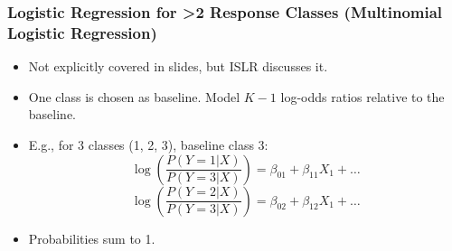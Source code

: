 \documentclass[12pt,a4paper]{article}
\begin{document}
\begin{itemize}
    \subsubsection{Logistic Regression for >2 Response Classes (Multinomial Logistic Regression) }
        \begin{itemize}
            \item Not explicitly covered in slides, but ISLR discusses it.
            \item One class is chosen as baseline. Model $K-1$ log-odds ratios relative to the baseline.
            \item E.g., for 3 classes (1, 2, 3), baseline class 3:
                $$ \log\left(\frac{P(Y=1|X)}{P(Y=3|X)}\right) = \beta_{01} + \beta_{11}X_1 + \dots $$
                $$ \log\left(\frac{P(Y=2|X)}{P(Y=3|X)}\right) = \beta_{02} + \beta_{12}X_1 + \dots $$
            \item Probabilities sum to 1.
        \end{itemize}

\end{itemize}
\end{document}
